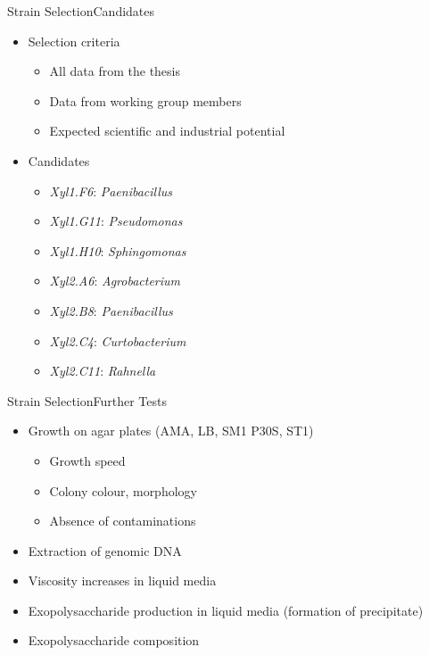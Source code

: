 \documentclass[mathserif]{beamer}
\newcommand{\mo}[1]{\emph{#1}} %
\newcommand{\xyli}[1]{\textit{Xyl1.#1}} %
\newcommand{\xylj}[1]{\textit{Xyl2.#1}} %
\newcommand{\EPS}{Exopolysaccharide}
\begin{document}
\begin{frame}{Strain Selection}{Candidates}
	\begin{itemize}
		\item Selection criteria
			\begin{itemize}
				\item All data from the thesis
				\item Data from working group members
				\item Expected scientific and industrial potential
			\end{itemize}
		\pause
		\item Candidates
			\begin{itemize}
				\item \xyli{F6}: \mo{Paenibacillus}
				\item \xyli{G11}: \mo{Pseudomonas}
				\item \xyli{H10}: \mo{Sphingomonas}
				\item \xylj{A6}: \mo{Agrobacterium}
				\item \xylj{B8}: \mo{Paenibacillus}
				\item \xylj{C4}: \mo{Curtobacterium}
				\item \xylj{C11}: \mo{Rahnella}
			\end{itemize}
	\end{itemize}
\end{frame}

\begin{frame}{Strain Selection}{Further Tests}
	\begin{itemize}
		\item Growth on agar plates (AMA, LB, SM1 P30S, ST1)
			\begin{itemize}
				\item Growth speed
				\item Colony colour, morphology
				\item Absence of contaminations
			\end{itemize}
		\pause
		\item Extraction of genomic DNA
		\pause
		\item Viscosity increases in liquid media
		\pause
		\item \EPS{} production in liquid media (formation of precipitate)
		\pause
		\item \EPS{} composition
	\end{itemize}
\end{frame}
\end{document}
